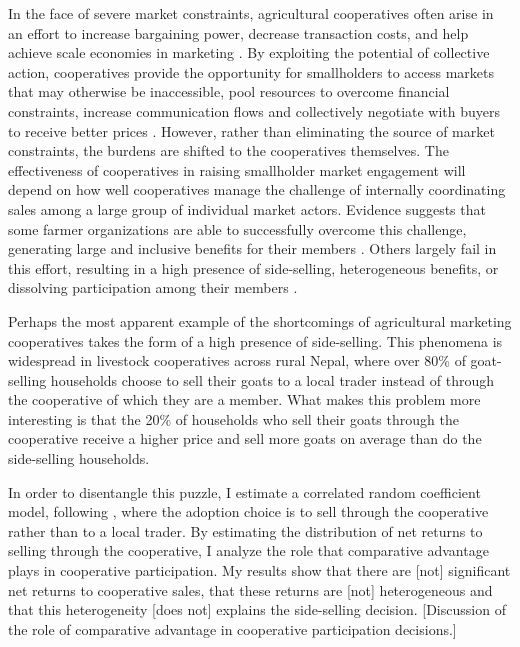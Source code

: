 \documentclass[11pt]{article}
\begin{document}
In the face of severe market constraints, agricultural cooperatives often arise in an effort to increase bargaining power, decrease transaction costs, and help achieve scale economies in marketing \citep{markelova-et.al.09,rondot-collion01,staal-et.al.97,worldbank03}. By exploiting the potential of collective action, cooperatives provide the opportunity for smallholders to access markets that may otherwise be inaccessible, pool resources to overcome financial constraints, increase communication flows and collectively negotiate with buyers to receive better prices \citep{poole-defrece10}. However, rather than eliminating the source of market constraints, the burdens are shifted to the cooperatives themselves. The effectiveness of cooperatives in raising smallholder market engagement will depend on how well cooperatives manage the challenge of internally coordinating sales among a large group of individual market actors. Evidence suggests that some farmer organizations are able to successfully overcome this challenge, generating large and inclusive benefits for their members \citep{narrod-et.al.09,tadesse-bahiigwa15,wollni-zeller07}. Others largely fail in this effort, resulting in a high presence of side-selling, heterogeneous benefits, or dissolving participation among their members \citep{aflagah-et.al.19,bernard-spielman09, casaburi-macchiavello15}. 

Perhaps the most apparent example of the shortcomings of agricultural marketing cooperatives takes the form of a high presence of side-selling. This phenomena is widespread in livestock cooperatives across rural Nepal, where over 80\% of goat-selling households choose to sell their goats to a local trader instead of through the cooperative of which they are a member. What makes this problem more interesting is that the 20\% of households who sell their goats through the cooperative receive a higher price and sell more goats on average than do the side-selling households.

In order to disentangle this puzzle, I estimate a correlated random coefficient model, following \citet{suri11}, where the adoption choice is to sell through the cooperative rather than to a local trader. By estimating the distribution of net returns to selling through the cooperative, I analyze the role that comparative advantage plays in cooperative participation. My results show that there are [not] significant net returns to cooperative sales, that these returns are [not] heterogeneous and that this heterogeneity [does not] explains the side-selling decision. [Discussion of the role of comparative advantage in cooperative participation decisions.]
\end{document}
